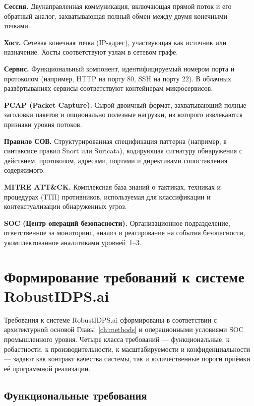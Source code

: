 \noindent\textbf{Сессия.} Двунаправленная коммуникация, включающая прямой поток и его обратный аналог, захватывающая полный обмен между двумя конечными точками.

\noindent\textbf{Хост.} Сетевая конечная точка (IP-адрес), участвующая как источник или назначение. Хосты соответствуют узлам в сетевом графе.

\noindent\textbf{Сервис.} Функциональный компонент, идентифицируемый номером порта и протоколом (например, HTTP на порту 80, SSH на порту 22). В облачных развёртываниях сервисы соответствуют контейнерам микросервисов.

\noindent\textbf{PCAP (Packet Capture).} Сырой двоичный формат, захватывающий полные заголовки пакетов и опционально полезные нагрузки, из которого извлекаются признаки уровня потоков.

\noindent\textbf{Правило СОВ.} Структурированная спецификация паттерна (например, в синтаксисе правил Snort или Suricata), кодирующая сигнатуру обнаружения с действием, протоколом, адресами, портами и директивами сопоставления содержимого.

\noindent\textbf{MITRE ATT\&CK.} Комплексная база знаний о тактиках, техниках и процедурах (ТТП) противников, используемая для классификации и контекстуализации обнаруженных угроз.

\noindent\textbf{SOC (Центр операций безопасности).} Организационное подразделение, ответственное за мониторинг, анализ и реагирование на события безопасности, укомплектованное аналитиками уровней~1--3.

\section{Формирование требований к системе RobustIDPS.ai}
\label{sec:requirements}

Требования к системе RobustIDPS.ai сформированы в соответствии с архитектурной основой Главы~\ref{ch:methods} и операционными условиями SOC промышленного уровня. Четыре класса требований --- функциональные, к робастности, к производительности, к масштабируемости и конфиденциальности --- задают как контракт качества системы, так и количественные пороги приёмки её программной реализации.

\subsection{Функциональные требования}
\label{subsec:req_functional}

